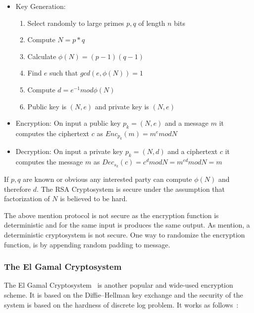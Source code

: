 \begin{itemize}
  \item Key Generation:
    \begin{enumerate}
      \item Select randomly to large primes $p, q$ of length $n$ bits
      \item Compute $N = p*q$
      \item Calculate $\phi(N) = (p - 1)(q - 1)$
      \item Find $e$ such that $gcd(e, \phi(N)) = 1$
      \item Compute $d = e^{-1} mod\phi(N)$
      \item Public key is $(N, e)$ and private key is $(N, e)$
    \end{enumerate}
  \item Encryption: On input a public key $p_k = (N, e)$ and a message $m$ it computes the ciphertext $c$ as $ Enc_{p_k}(m) = m^{e}modN$
  \item Decryption: On input a private key $p_k = (N, d)$ and a ciphertext $c$ it computes the message $m$ as $ Dec_{s_k}(c) = c^{d}modN = m^{ed}modN = m$
\end{itemize}

If $p, q$ are known or obvious any interested party can compute $\phi(N)$ and therefore $d$. The RSA Cryptosystem is secure under the assumption that factorization of $N$ is believed to be hard.

The above mention protocol is not secure as the encryption function is deterministic and for the same input is produces the same output. As mention, a deterministic cryptosystem is not secure. One way to randomize the encryption function, is by appending random padding to message.

\subsubsection{The El Gamal Cryptosystem}
\label{preliminaries:crypto_block:pub:el_gamal}

The El Gamal Cryptosystem~\cite{el_gamal} is another popular and wide-used encryption scheme. It is based on the Diffie–Hellman key exchange and the security of the system is based on the hardness of discrete log problem. It works as follows~\cite{Katz:2014:IMC:2700550, kiagias:crypto}:

